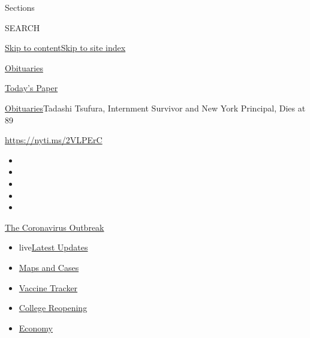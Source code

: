 Sections

SEARCH

\protect\hyperlink{site-content}{Skip to
content}\protect\hyperlink{site-index}{Skip to site index}

\href{https://www.nytimes3xbfgragh.onion/section/obituaries}{Obituaries}

\href{https://myaccount.nytimes3xbfgragh.onion/auth/login?response_type=cookie\&client_id=vi}{}

\href{https://www.nytimes3xbfgragh.onion/section/todayspaper}{Today's
Paper}

\href{/section/obituaries}{Obituaries}\textbar{}Tadashi Tsufura,
Internment Survivor and New York Principal, Dies at 89

\url{https://nyti.ms/2VLPErC}

\begin{itemize}
\item
\item
\item
\item
\item
\end{itemize}

\href{https://www.nytimes3xbfgragh.onion/news-event/coronavirus?action=click\&pgtype=Article\&state=default\&region=TOP_BANNER\&context=storylines_menu}{The
Coronavirus Outbreak}

\begin{itemize}
\tightlist
\item
  live\href{https://www.nytimes3xbfgragh.onion/2020/08/04/world/coronavirus-covid-19.html?action=click\&pgtype=Article\&state=default\&region=TOP_BANNER\&context=storylines_menu}{Latest
  Updates}
\item
  \href{https://www.nytimes3xbfgragh.onion/interactive/2020/us/coronavirus-us-cases.html?action=click\&pgtype=Article\&state=default\&region=TOP_BANNER\&context=storylines_menu}{Maps
  and Cases}
\item
  \href{https://www.nytimes3xbfgragh.onion/interactive/2020/science/coronavirus-vaccine-tracker.html?action=click\&pgtype=Article\&state=default\&region=TOP_BANNER\&context=storylines_menu}{Vaccine
  Tracker}
\item
  \href{https://www.nytimes3xbfgragh.onion/2020/08/02/us/covid-college-reopening.html?action=click\&pgtype=Article\&state=default\&region=TOP_BANNER\&context=storylines_menu}{College
  Reopening}
\item
  \href{https://www.nytimes3xbfgragh.onion/live/2020/08/03/business/stock-market-today-coronavirus?action=click\&pgtype=Article\&state=default\&region=TOP_BANNER\&context=storylines_menu}{Economy}
\end{itemize}

